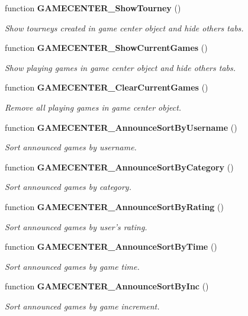 \begin{CompactItemize}
function {\bf GAMECENTER\_\-ShowTourney} ()
\begin{CompactList}\small\item\em Show tourneys created in game center object and hide others tabs. \item\end{CompactList}\item 
function {\bf GAMECENTER\_\-ShowCurrentGames} ()
\begin{CompactList}\small\item\em Show playing games in game center object and hide others tabs. \item\end{CompactList}\item 
function {\bf GAMECENTER\_\-ClearCurrentGames} ()
\begin{CompactList}\small\item\em Remove all playing games in game center object. \item\end{CompactList}\item 
function {\bf GAMECENTER\_\-AnnounceSortByUsername} ()
\begin{CompactList}\small\item\em Sort announced games by username. \item\end{CompactList}\item 
function {\bf GAMECENTER\_\-AnnounceSortByCategory} ()
\begin{CompactList}\small\item\em Sort announced games by category. \item\end{CompactList}\item 
function {\bf GAMECENTER\_\-AnnounceSortByRating} ()
\begin{CompactList}\small\item\em Sort announced games by user's rating. \item\end{CompactList}\item 
function {\bf GAMECENTER\_\-AnnounceSortByTime} ()
\begin{CompactList}\small\item\em Sort announced games by game time. \item\end{CompactList}\item 
function {\bf GAMECENTER\_\-AnnounceSortByInc} ()
\begin{CompactList}\small\item\em Sort announced games by game increment. \item\end{CompactList}\item 

\end{CompactItemize}
